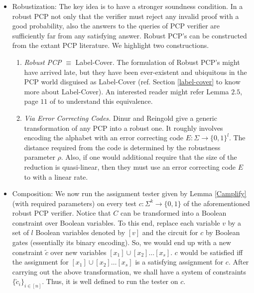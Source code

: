 \begin{itemize}
\item {\sf Robustization:} The key idea is to have a stronger
  soundness condition. In a robust PCP not only that the verifier must
  reject any invalid proof with a good probability, also the answers
  to the queries of PCP verifier are sufficiently far from any
  satisfying answer.  Robust PCP's can be constructed from the extant
  PCP literature. We highlight two constructions.
\begin{enumerate}
\item {\em Robust PCP} $\equiv$ {\sc Label-Cover}.  The formulation of
  Robust PCP's might have arrived late, but they have been
  ever-existent and ubiquitous in the PCP world disguised as {\sc
    Label-Cover} (ref. Section \ref{label-cover} to know more about
  {\sc Label-Cover}).  An interested reader might refer Lemma $2.5$,
  page $11$ of \cite{DH} to understand this equivalence.


\item {\em Via Error Correcting Codes.} Dinur and Reingold \cite{DR}
  give a generic transformation of any PCP into a robust one. It
  roughly involves encoding the alphabet with an error correcting code
  $E: \Sigma \rightarrow \{0,1\}^l$. The distance required from the
  code is determined by the robustness parameter $\rho$. Also, if one
  would additional require that the size of the reduction is
  quasi-linear, then they must use an error correcting code $E$ to
  with a linear rate.
\end{enumerate}

\item {\sf Composition:} We now run the assignment tester given by
  Lemma \ref{Camplify} (with required parameters) on every test $c :
  \Sigma^k \rightarrow \{0,1\}$ of the aforementioned robust PCP
  verifier. Notice that $C$ can be transformed into a Boolean
  constraint over Boolean variables. To this end, replace each
  variable $v$ by a set of $l$ Boolean variables denoted by $[v]$ and
  the circuit for $c$ by Boolean gates (essentially its binary
  encoding).  So, we would end up with a new constraint $\tilde{c}$
  over new variables $[x_1] \cup [x_2] \ldots [x_s]$.  $c$ would be
  satisfied iff the assignment for $[x_1] \cup [x_2] \ldots [x_s]$ is
  a satisfying assignment for $c$. After carrying out the above
  transformation, we shall have a system of constraints
  $\{\tilde{c}_i\}_{i \in [n]}$.  Thus, it is well defined
  to run the tester on ${c}$.


\end{itemize}
